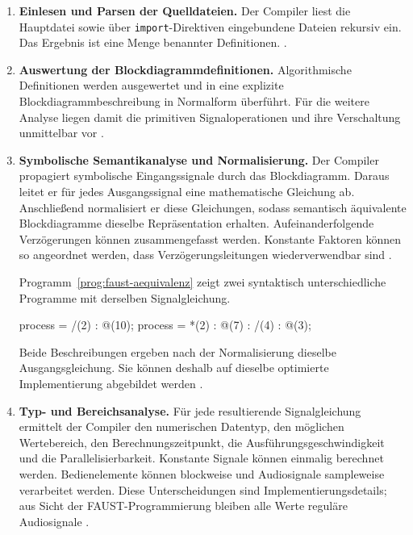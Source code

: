 \begin{enumerate}
	\item \textbf{Einlesen und Parsen der Quelldateien.} Der Compiler liest die Hauptdatei sowie über \texttt{import}-Direktiven eingebundene Dateien rekursiv ein. Das Ergebnis ist eine Menge benannter Definitionen. \parencite[S.~10--11]{orlarey:hal-02159014}.

	\item \textbf{Auswertung der Blockdiagrammdefinitionen.} Algorithmische Definitionen werden ausgewertet und in eine explizite Blockdiagrammbeschreibung in Normalform überführt. Für die weitere Analyse liegen damit die primitiven Signaloperationen und ihre Verschaltung unmittelbar vor \parencite[S.~11--12]{orlarey:hal-02159014}.
	
	\item \textbf{Symbolische Semantikanalyse und Normalisierung.} Der Compiler propagiert symbolische Eingangssignale durch das Blockdiagramm. Daraus leitet er für jedes Ausgangssignal eine mathematische Gleichung ab. Anschließend normalisiert er diese Gleichungen, sodass semantisch äquivalente Blockdiagramme dieselbe Repräsentation erhalten. Aufeinanderfolgende Verzögerungen können zusammengefasst werden. Konstante Faktoren können so angeordnet werden, dass Verzögerungsleitungen wiederverwendbar sind \parencite[S.~12]{orlarey:hal-02159014}.
	
	Programm~\ref{prog:faust-aequivalenz} zeigt zwei syntaktisch unterschiedliche Programme mit derselben Signalgleichung.
	
	\begin{program}
		\caption{Semantisch äquivalente FAUST-Beschreibungen}
		\label{prog:faust-aequivalenz}
		\begin{GenericCode}
			process = /(2) : @(10);
			process = *(2) : @(7) : /(4) : @(3);
		\end{GenericCode}
	\end{program}

	Beide Beschreibungen ergeben nach der Normalisierung dieselbe Ausgangsgleichung. Sie können deshalb auf dieselbe optimierte Implementierung abgebildet werden \parencite[S.~12]{orlarey:hal-02159014}.
	
	\item \textbf{Typ- und Bereichsanalyse.} Für jede resultierende Signalgleichung ermittelt der Compiler den numerischen Datentyp, den möglichen Wertebereich, den Berechnungszeitpunkt, die Ausführungsgeschwindigkeit und die Parallelisierbarkeit. Konstante Signale können einmalig berechnet werden. Bedienelemente können blockweise und Audiosignale sampleweise verarbeitet werden. Diese Unterscheidungen sind Implementierungsdetails; aus Sicht der FAUST-Programmierung bleiben alle Werte reguläre Audiosignale \parencite[S.~12--13]{orlarey:hal-02159014}.
	

\end{enumerate}
